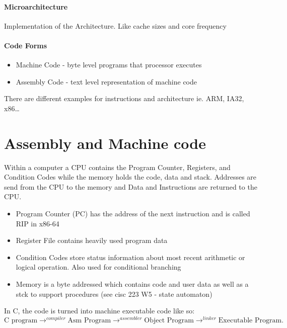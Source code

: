 \documentclass[12pt]{book}
\begin{document}
\paragraph{Microarchitecture}
Implementation of the Architecture. Like cache sizes and core frequency

\paragraph{Code Forms}
\begin{itemize}
        \item Machine Code - byte level programs that processor executes
        \item Assembly Code - text level representation of machine code
\end{itemize}

There are different examples for instructions and architecture ie. ARM, IA32, x86\ldots

\section*{Assembly and Machine code}
Within a computer a CPU contains the Program Counter, Registers, and Condition Codes while the memory holds the code, data and stack.
Addresses are send from the CPU to the memory and Data and Instructions are returned to the CPU.
\begin{itemize}
        \item Program Counter (PC) has the address of the next instruction and is called RIP in x86-64
        \item Register File contains heavily used program data
        \item Condition Codes store status information about most recent arithmetic or logical operation. Also used for conditional branching
        \item Memory is a byte addressed which contains code and user data as well as a stck to support procedures (see cisc 223 W5 - 
                state automaton)
\end{itemize}

In C, the code is turned into machine executable code like so:
{\scriptsize
\[
\text{C program}\to ^{compiler} \text{Asm Program}\to ^{assembler} \text{Object Program}\to^{linker} \text{Executable Program}
.\] 
}
\pagebreak
\end{document}
